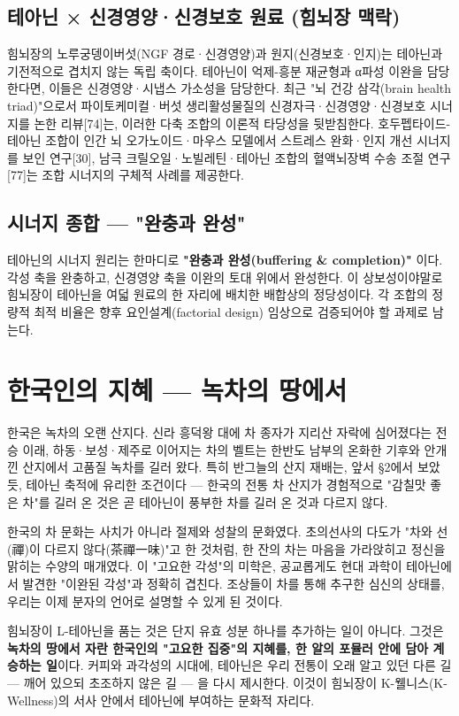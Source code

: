 \documentclass[11pt,oneside]{book}
\begin{document}
\subsection{테아닌 × 신경영양·신경보호 원료 (힘뇌장 맥락)}
힘뇌장의 노루궁뎅이버섯(NGF 경로·신경영양)과 원지(신경보호·인지)는 테아닌과 기전적으로 겹치지 않는 독립 축이다. 테아닌이 억제-흥분 재균형과 α파성 이완을 담당한다면, 이들은 신경영양·시냅스 가소성을 담당한다. 최근 "뇌 건강 삼각(brain health triad)"으로서 파이토케미컬·버섯 생리활성물질의 신경자극·신경영양·신경보호 시너지를 논한 리뷰[74]는, 이러한 다축 조합의 이론적 타당성을 뒷받침한다. 호두펩타이드-테아닌 조합이 인간 뇌 오가노이드·마우스 모델에서 스트레스 완화·인지 개선 시너지를 보인 연구[30], 남극 크릴오일·노빌레틴·테아닌 조합의 혈액뇌장벽 수송 조절 연구[77]는 조합 시너지의 구체적 사례를 제공한다.

\subsection{시너지 종합 — "완충과 완성"}
테아닌의 시너지 원리는 한마디로 \textbf{"완충과 완성(buffering \& completion)"} 이다. 각성 축을 완충하고, 신경영양 축을 이완의 토대 위에서 완성한다. 이 상보성이야말로 힘뇌장이 테아닌을 여덟 원료의 한 자리에 배치한 배합상의 정당성이다. 각 조합의 정량적 최적 비율은 향후 요인설계(factorial design) 임상으로 검증되어야 할 과제로 남는다.

\section{한국인의 지혜 — 녹차의 땅에서}
한국은 녹차의 오랜 산지다. 신라 흥덕왕 대에 차 종자가 지리산 자락에 심어졌다는 전승 이래, 하동·보성·제주로 이어지는 차의 벨트는 한반도 남부의 온화한 기후와 안개 낀 산지에서 고품질 녹차를 길러 왔다. 특히 반그늘의 산지 재배는, 앞서 §2에서 보았듯, 테아닌 축적에 유리한 조건이다 — 한국의 전통 차 산지가 경험적으로 "감칠맛 좋은 차"를 길러 온 것은 곧 테아닌이 풍부한 차를 길러 온 것과 다르지 않다.

한국의 차 문화는 사치가 아니라 절제와 성찰의 문화였다. 초의선사의 다도가 "차와 선(禪)이 다르지 않다(茶禪一味)"고 한 것처럼, 한 잔의 차는 마음을 가라앉히고 정신을 맑히는 수양의 매개였다. 이 "고요한 각성"의 미학은, 공교롭게도 현대 과학이 테아닌에서 발견한 "이완된 각성"과 정확히 겹친다. 조상들이 차를 통해 추구한 심신의 상태를, 우리는 이제 분자의 언어로 설명할 수 있게 된 것이다.

힘뇌장이 L-테아닌을 품는 것은 단지 유효 성분 하나를 추가하는 일이 아니다. 그것은 \textbf{녹차의 땅에서 자란 한국인의 "고요한 집중"의 지혜를, 한 알의 포뮬러 안에 담아 계승하는 일}이다. 커피와 과각성의 시대에, 테아닌은 우리 전통이 오래 알고 있던 다른 길 — 깨어 있으되 초조하지 않은 길 — 을 다시 제시한다. 이것이 힘뇌장이 K-웰니스(K-Wellness)의 서사 안에서 테아닌에 부여하는 문화적 자리다.
\end{document}
